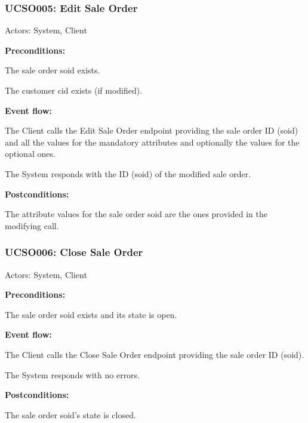 \begin{ucbox}{\subsubsection{UCSO005: Edit Sale Order}}
\label{UCSO005}

Actors: System, Client

\textbf{Preconditions:}

\ucitem The sale order soid exists.

\ucitem The customer cid exists (if modified).

\textbf{Event flow:}

\ucitem The Client calls the Edit Sale Order endpoint providing the sale order ID (soid) and all the values for the mandatory attributes and optionally the values for the 
optional ones.

\ucitem The System responds with the ID (soid) of the modified sale order.

\textbf{Postconditions:}

\ucitem The attribute values for the sale order soid are the ones provided in the modifying call.

\end{ucbox}

\begin{ucbox}{\subsubsection{UCSO006: Close Sale Order}}
\label{UCSO006}

Actors: System, Client

\textbf{Preconditions:}

\ucitem The sale order soid exists and its state is open.

\textbf{Event flow:}

\ucitem The Client calls the Close Sale Order endpoint providing the sale order ID (soid).

\ucitem The System responds with no errors.

\textbf{Postconditions:}

\ucitem The sale order soid’s state is closed.

\end{ucbox}

